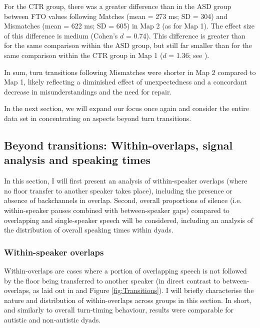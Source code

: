 For the CTR group, there was a greater difference than in the ASD group between FTO values following Matches (mean = 273 ms; SD = 304) and Mismatches (mean = 622 ms; SD = 605) in Map 2 (as for Map 1). The effect size of this difference is medium (Cohen's \(d\) = 0.74). This difference is greater than for the same comparison within the ASD group, but still far smaller than for the same comparison within the CTR group in Map 1 (\(d\) = 1.36; see ).

In sum, turn transitions following Mismatches were shorter in Map 2 compared to Map 1, likely reflecting a diminished effect of unexpectedness and a concordant decrease in misunderstandings and the need for repair.

In the next section, we will expand our focus once again and consider the entire data set in concentrating on aspects beyond turn transitions.

\subsection{Beyond transitions: Within-overlaps, signal analysis and speaking times}\label{turntaking_results_signal}

In this section, I will first present an analysis of within-speaker overlaps (where no floor transfer to another speaker takes place), including the presence or absence of backchannels in overlap. Second, overall proportions of silence (i.e. with\-in-speaker pauses combined with between-speaker gaps) compared to overlapping and single-speaker speech will be considered, including an analysis of the distribution of overall speaking times within dyads.


\subsubsection{Within-speaker overlaps}\label{turntaking_results_signal_within}


Within-overlaps are cases where a portion of overlapping speech is not followed by the floor being transferred to another speaker (in direct contrast to between-overlaps, as laid out in  and Figure \ref{fig:Transitions}). I will briefly characterise the nature and distribution of within-overlaps across groups in this section. In short, and similarly to overall turn-timing behaviour, results were comparable for autistic and non-autistic dyads.

